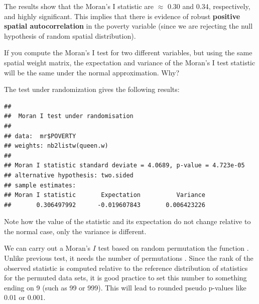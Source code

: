 The results show that the Moran's I statistic are $\approx$ 0.30 and 0.34, respectively, and highly significant. This implies that there is evidence of robust \textbf{positive spatial autocorrelation} in the poverty variable (since we are rejecting the null hypothesis of random spatial distribution).


\begin{remark}
If you compute the Moran's I test for two different variables, but using the same spatial weight matrix, the expectation and variance of the Moran's I test statistic will be the same under the normal approximation. Why? 
\end{remark}

The test under randomization gives the following results:

\begin{knitrout}
\color{fgcolor}\begin{kframe}
\begin{alltt}
\hlopt{$}  \hlstd{=} 
            \hlstd{=} \hlstd{)}
\end{alltt}
\begin{verbatim}
## 
## 	Moran I test under randomisation
## 
## data:  mr$POVERTY  
## weights: nb2listw(queen.w)    
## 
## Moran I statistic standard deviate = 4.0689, p-value = 4.723e-05
## alternative hypothesis: two.sided
## sample estimates:
## Moran I statistic       Expectation          Variance 
##       0.306497992      -0.019607843       0.006423226
\end{verbatim}
\end{kframe}
\end{knitrout}

Note how the value of the statistic and its expectation do not change relative to the normal case, only the variance is different.

We can carry out a Moran's $I$ test based on random permutation the function . Unlike previous test, it needs the number of permutations . Since the rank of the observed statistic is computed relative to the reference distribution of statistics for the permuted data sets, it is good practice to set this number to something ending on 9 (such as 99 or 999). This will lead to rounded pseudo p-values like 0.01 or 0.001. 


